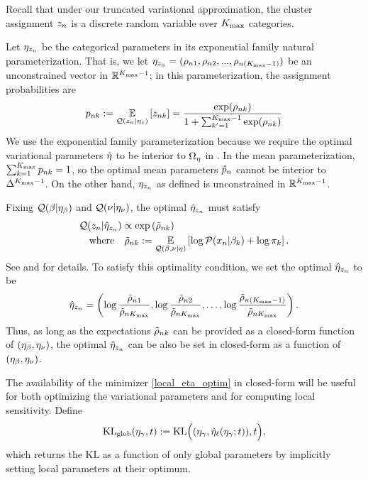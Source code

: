 \begin{ex}
Recall that under our truncated variational approximation,
the cluster assignment $z_n$ is a discrete random variable
over ${K_{\mathrm{max}}}$ categories.

Let $\eta_{z_n}$ be the categorical parameters in its
exponential family natural parameterization.
That is, we let $\eta_{z_n} = (\rho_{n1}, \rho_{n2}, ..., \rho_{n({K_{\mathrm{max}}}-1)})$
be an unconstrained vector in $\mathbb{R}^{{K_{\mathrm{max}}}-1}$;
in this parameterization, the assignment probabilities are
%
\begin{align*}
  p_{nk} := \underset{\mathcal{Q}(z_n \vert \eta_{z})}{\mathbb{E}}\left[z_{nk}\right] =
  \frac{\exp(\rho_{nk})}{1 + \sum_{k'=1}^{{K_{\mathrm{max}}}-1}\exp(\rho_{nk})}
\end{align*}
%
We use the exponential family parameterization because
we require the optimal variational parameters $\hat\eta$
to be interior to $\Omega_{\eta}$ in .
In the mean parameterization,
$\sum_{k=1}^{K_{\mathrm{max}}} p_{nk} = 1$, so the
optimal mean parameters $\hat p_{n}$ cannot be
interior to $\Delta^{{K_{\mathrm{max}}} - 1}$.
On the other hand, $\eta_{z_n}$ as defined
is unconstrained in $\mathbb{R}^{{K_{\mathrm{max}}} - 1}$.

Fixing $\mathcal{Q}(\beta\vert\eta_{\beta})$ and $\mathcal{Q}(\nu\vert\eta_{\nu})$,
the optimal $\hat\eta_{z_n}$ must satisfy
%
\begin{align*}
& \mathcal{Q}(z_n | \hat\eta_{z_n}) \propto \exp\left(\tilde \rho_{nk}\right)\\
& \quad\textrm{where}\quad \tilde \rho_{nk} := \underset{\mathcal{Q}(\beta, \nu \vert \eta)}{\mathbb{E}}\left[\log \mathcal{P}(x_n \vert \beta_k) + \log \pi_k\right].
\end{align*}
%
See \citet{bishop:2006:PRML} and \citet{blei:2017:vi_review} for details.
To satisfy this optimality condition,
we set the optimal $\hat\eta_{z_n}$ to be
%
\begin{align*}
%
\etaopt_{\z_\n} = \left(\log\frac{\tilde\rho_{\n1}}{\tilde\rho_{\n\kmax}},
\log\frac{\tilde\rho_{\n2}}{\tilde\rho_{\n\kmax}}, \ldots,
\log\frac{\tilde\rho_{\n(\kmax-1)}}{\tilde\rho_{\n\kmax}}\right).
%
\end{align*}
%
Thus, as long as the expectations $\tilde\rho_{nk}$ can be provided
as a closed-form function of
$(\eta_{\beta}, \eta_{\nu})$, the optimal $\hat\eta_{z_n}$ can be also be set in closed-form as
a function of $(\eta_{\beta}, \eta_{\nu})$.
%
\end{ex}

The availability of the minimizer \eqref{local_eta_optim}
in closed-form will be useful for both optimizing the variational parameters
and for computing local sensitivity.
Define
\begin{align*}
\mathrm{KL}_{\mathrm{glob}}(\eta_\gamma, t) := \mathrm{KL}\Big((\eta_\gamma, \hat\eta_{\ell}(\eta_\gamma; t)), t\Big),
\end{align*}
which returns the $\mathrm{KL}$ as a function of only global parameters
by implicitly setting local parameters at their optimum.

